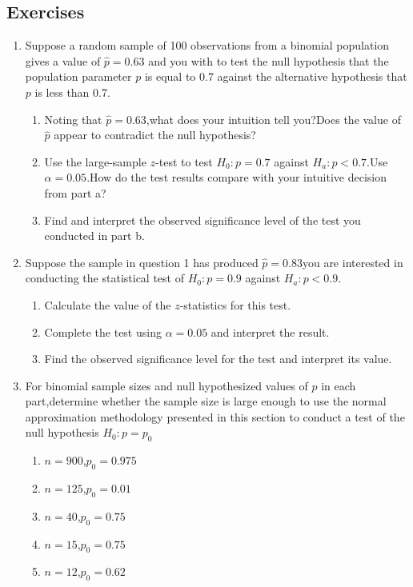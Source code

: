 \subsection{Exercises}
\begin{enumerate}
\item Suppose a random sample of 100 observations from a binomial population gives a value of $\hat{p}=0.63$ and you with to test the null hypothesis that the population parameter $p$ is equal to 0.7 against the alternative hypothesis that $p$ is less than 0.7.
\begin{enumerate}
\item Noting that $\hat{p}=0.63$,what does your intuition tell you?Does the value of $\hat{p}$ appear to contradict the null hypothesis?
\item Use the large-sample $z$-test to test $H_0:p=0.7$ against $H_a:p<0.7$.Use $\alpha=0.05$.How do the test results compare with your intuitive decision from part a?
\item Find and interpret the observed significance level of the test you conducted in part b.
\end{enumerate}
\item Suppose the sample in question 1 has produced $\hat{p}=0.83$you are interested in conducting the statistical test of $H_0:p=0.9$ against $H_a:p<0.9$.
\begin{enumerate}
\item  Calculate the value of the $z$-statistics for this test.
\item  Complete the test using $\alpha=0.05$ and interpret the result.
\item  Find the observed significance level for the test and interpret its value.
\end{enumerate}
\item For binomial sample sizes and null hypothesized values of $p$ in each part,determine whether the sample size is large enough to use the normal approximation methodology presented in this section to conduct a test of the null hypothesis  $H_0:p=p_0$
  \begin{enumerate}
\item $n=900$,$p_0=0.975$
\item $n=125$,$p_0=0.01$
\item $n=40$,$p_0=0.75$
\item $n=15$,$p_0=0.75$
\item $n=12$,$p_0=0.62$
\end{enumerate}
\end{enumerate}